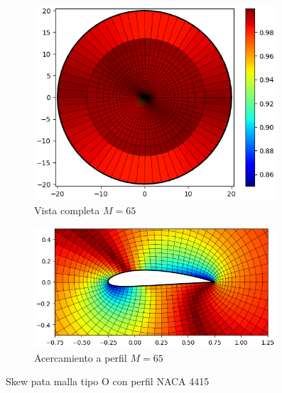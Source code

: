 \documentclass[letterpaper, openright, 12pt]{book}
\begin{document}
\begin{figure}[htbp!]
\begin{subfigure}[c]{0.48\textwidth}
            \includegraphics[keepaspectratio,
                width=0.99\textwidth]{./img/naca4415_m_65_skew_far}
            \caption{Vista completa $M=65$}
            \label{fig:naca4415_m_65_skew_far}
        \end{subfigure}
        \hfill
        \begin{subfigure}[c]{0.48\textwidth}
            \includegraphics[keepaspectratio,
                width=0.99\textwidth]{./img/naca4415_m_65_skew_close}
            \caption{Acercamiento a perfil $M=65$}
            \label{fig:naca4415_m_65_skew_close}
        \end{subfigure}
        \caption{Skew pata malla tipo O con perfil NACA 4415}
    \end{figure}
\end{document}
